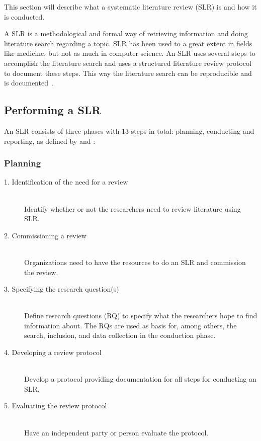 This section will describe what a systematic literature review (SLR) is and how it is conducted. 

A SLR is a methodological and formal way of retrieving information and doing literature search regarding a topic. SLR has been used to a great extent in fields like medicine, but not as much in computer science. An SLR uses several steps to accomplish the literature search and uses a structured literature review protocol to document these steps. This way the literature search can be reproducible and is documented~\citep{paper:slrdesc}.

\subsection{Performing a SLR}

An SLR consists of three phases with 13 steps in total: planning, conducting and reporting, as defined by \cite{paper:slrdesc} and \cite{master:slr}:

\subsubsection{Planning}

\begin{description}

	\item[1. Identification of the need for a review] \hfill \\
		Identify whether or not the researchers need to review literature using SLR.

	\item[2. Commissioning a review] \hfill \\
		Organizations need to have the resources to do an SLR and commission the review.

	\item[3. Specifying the research question(s)] \hfill \\
		Define research questions (RQ) to specify what the researchers hope to find information about. The RQs are used as basis for, among others, the search, inclusion, and data collection in the conduction phase. 

	\item[4. Developing a review protocol] \hfill \\
		Develop a protocol providing documentation for all steps for conducting an SLR.
	

	\item[5. Evaluating the review protocol] \hfill \\
		Have an independent party or person evaluate the protocol.

\end{description}

